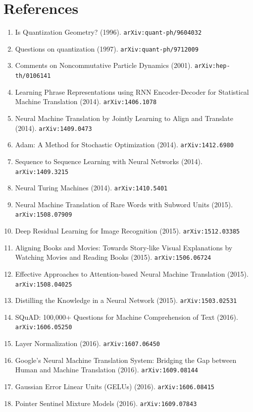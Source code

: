 \documentclass[11pt]{article}
\begin{document}
\section*{References}
\begin{enumerate}\small
  \item Is Quantization Geometry? (1996). \texttt{arXiv:quant-ph/9604032}
  \item Questions on quantization (1997). \texttt{arXiv:quant-ph/9712009}
  \item Comments on Noncommutative Particle Dynamics (2001). \texttt{arXiv:hep-th/0106141}
  \item Learning Phrase Representations using RNN Encoder-Decoder for
  Statistical Machine Translation (2014). \texttt{arXiv:1406.1078}
  \item Neural Machine Translation by Jointly Learning to Align and Translate (2014). \texttt{arXiv:1409.0473}
  \item Adam: A Method for Stochastic Optimization (2014). \texttt{arXiv:1412.6980}
  \item Sequence to Sequence Learning with Neural Networks (2014). \texttt{arXiv:1409.3215}
  \item Neural Turing Machines (2014). \texttt{arXiv:1410.5401}
  \item Neural Machine Translation of Rare Words with Subword Units (2015). \texttt{arXiv:1508.07909}
  \item Deep Residual Learning for Image Recognition (2015). \texttt{arXiv:1512.03385}
  \item Aligning Books and Movies: Towards Story-like Visual Explanations by
  Watching Movies and Reading Books (2015). \texttt{arXiv:1506.06724}
  \item Effective Approaches to Attention-based Neural Machine Translation (2015). \texttt{arXiv:1508.04025}
  \item Distilling the Knowledge in a Neural Network (2015). \texttt{arXiv:1503.02531}
  \item SQuAD: 100,000+ Questions for Machine Comprehension of Text (2016). \texttt{arXiv:1606.05250}
  \item Layer Normalization (2016). \texttt{arXiv:1607.06450}
  \item Google's Neural Machine Translation System: Bridging the Gap between
  Human and Machine Translation (2016). \texttt{arXiv:1609.08144}
  \item Gaussian Error Linear Units (GELUs) (2016). \texttt{arXiv:1606.08415}
  \item Pointer Sentinel Mixture Models (2016). \texttt{arXiv:1609.07843}

\end{enumerate}
\end{document}
